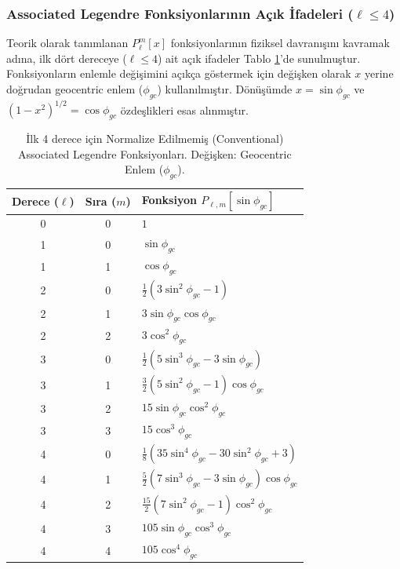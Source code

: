 \subsubsection{Associated Legendre Fonksiyonlarının Açık İfadeleri ($\ell \le 4$)}
\label{subsubsec:explicit_legendre}

Teorik olarak tanımlanan $P_\ell^m[x]$ fonksiyonlarının fiziksel davranışını kavramak adına,
ilk dört dereceye ($\ell \le 4$) ait açık ifadeler Tablo \ref{tab:assoc_legendre_trig}'de sunulmuştur.
Fonksiyonların enlemle değişimini açıkça göstermek için değişken olarak $x$ yerine
doğrudan geocentric enlem ($\phi_{gc}$) kullanılmıştır.
Dönüşümde $x = \sin\phi_{gc}$ ve $(1-x^2)^{1/2} = \cos\phi_{gc}$ özdeşlikleri esas alınmıştır.

\begin{table}[h!]
    \centering
    \caption{İlk 4 derece için Normalize Edilmemiş (Conventional) Associated Legendre Fonksiyonları. Değişken: Geocentric Enlem ($\phi_{gc}$).}
    \renewcommand{\arraystretch}{1.8} %
    \begin{tabular}{c c l}
        \hline
        \textbf{Derece ($\ell$)} & \textbf{Sıra ($m$)} & \textbf{Fonksiyon $P_{\ell,m}[\sin\phi_{gc}]$} \\
        \hline
        0 & 0 & $1$ \\
        \hline
        1 & 0 & $\sin\phi_{gc}$ \\
        1 & 1 & $\cos\phi_{gc}$ \\
        \hline
        2 & 0 & $\frac{1}{2}(3\sin^2\phi_{gc} - 1)$ \\
        2 & 1 & $3\sin\phi_{gc}\cos\phi_{gc}$ \\
        2 & 2 & $3\cos^2\phi_{gc}$ \\
        \hline
        3 & 0 & $\frac{1}{2}(5\sin^3\phi_{gc} - 3\sin\phi_{gc})$ \\
        3 & 1 & $\frac{3}{2}(5\sin^2\phi_{gc} - 1)\cos\phi_{gc}$ \\
        3 & 2 & $15\sin\phi_{gc}\cos^2\phi_{gc}$ \\
        3 & 3 & $15\cos^3\phi_{gc}$ \\
        \hline
        4 & 0 & $\frac{1}{8}(35\sin^4\phi_{gc} - 30\sin^2\phi_{gc} + 3)$ \\
        4 & 1 & $\frac{5}{2}(7\sin^3\phi_{gc} - 3\sin\phi_{gc})\cos\phi_{gc}$ \\
        4 & 2 & $\frac{15}{2}(7\sin^2\phi_{gc} - 1)\cos^2\phi_{gc}$ \\
        4 & 3 & $105\sin\phi_{gc}\cos^3\phi_{gc}$ \\
        4 & 4 & $105\cos^4\phi_{gc}$ \\
        \hline
    \end{tabular}
    \label{tab:assoc_legendre_trig}
\end{table}

